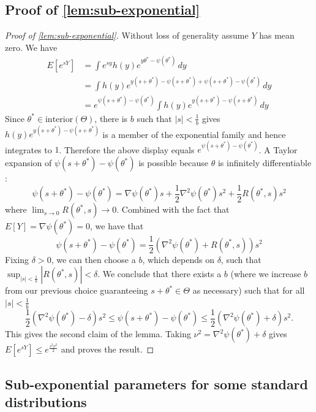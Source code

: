 \documentclass[ejs,noshowframe]{imsart}
\theoremstyle{plain}
\theoremstyle{definition}
\begin{document}
\begin{appendix}
\subsection{Proof of \autoref{lem:sub-exponential}}
\begin{proof}[Proof of \autoref{lem:sub-exponential}]
Without loss of generality assume $Y$ has mean zero. We have
\begin{align*}
E[e^{s Y}] &= \int e^{s y} h(y) e^{y \theta^{*} - \psi(\theta^{*})} \, dy\\
&= \int h(y) e^{y (s + \theta^{*}) - \psi(s + \theta^{*}) + \psi(s + 
\theta^{*}) - \psi(\theta^{*})} \, dy\\
&= e^{\psi(s + \theta^{*}) - \psi(\theta^{*})} \int h(y) e^{y(s + \theta^{*}) - 
\psi(s + \theta^{*})} \, dy
\end{align*}
Since $\theta^{*} \in \mathrm{interior}(\Theta)$, there is $b$ such that $|s| < 
\frac{1}{b}$ gives $h(y) e^{y(s + \theta^{*}) - \psi(s + \theta^{*})}$ is a 
member of the exponential family and hence integrates to $1$. Therefore the 
above display equals $e^{\psi(s + \theta^{*}) - \psi(\theta^{*})}$.
A Taylor expansion of $\psi(s + \theta^{*}) - \psi(\theta^{*})$ is possible 
because $\theta$ is infinitely differentiable \citep{Brown1986}:
  $$\psi(s + \theta^{*}) - \psi(\theta^{*}) = \nabla \psi(\theta^{*}) s + 
\frac{1}{2} \nabla^{2} \psi(\theta^{*}) s^2 + \frac{1}{2} R(\theta^{*}, s) s^2$$
  where $\lim_{s \to 0} R(\theta^{*}, s) \to 0$.
  Combined with the fact that $E[Y] = \nabla \psi(\theta^{*}) = 0$, we have that
  $$\psi(s + \theta^{*}) - \psi(\theta^{*}) = \frac{1}{2} \left(\nabla^{2} 
\psi(\theta^{*}) +  R(\theta^{*}, s)\right) s^2$$
Fixing $\delta>0$, we can then choose a $b$, which depends on $\delta$, such 
that\\ $\sup_{|s| < \frac{1}{b}} \left| R(\theta^{*}, s) \right| < \delta$. We 
conclude that there exists a $b$ (where we increase $b$ from our previous 
choice guaranteeing $s + \theta^{*} \in \Theta$ as necessary) such that for all 
$|s| < \frac{1}{b}$
  $$\frac{1}{2} \left(\nabla^{2} \psi(\theta^{*}) - \delta\right) s^{2} \leq 
\psi(s + \theta^{*}) - \psi(\theta^{*}) \leq \frac{1}{2} \left(\nabla^{2} 
\psi(\theta^{*}) + \delta\right) s^{2}.$$
  This gives the second claim of the lemma. Taking $\nu^{2} = \nabla^{2} 
\psi(\theta^{*}) + \delta$ gives
$E[e^{s Y}] \leq e^{\frac{s^{2} \nu^{2}}{2}}$ and proves the result.
\end{proof}
\subsection{Sub-exponential parameters for some standard distributions}


\end{appendix}
\end{document}

